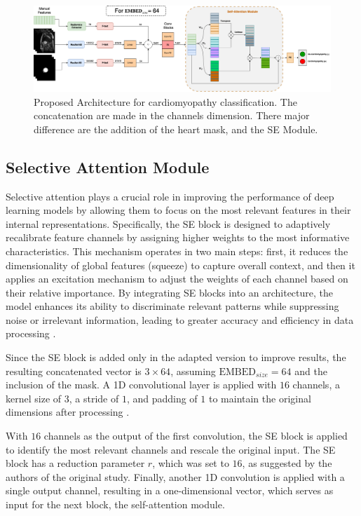 \documentclass[journal,twoside,web]{ieeecolor}
\begin{document}
\begin{figure}[h]
\centerline{\includegraphics[width=\columnwidth]{figures/fig02.png}}
\caption{Proposed Architecture for cardiomyopathy classification. The concatenation are made in the channels dimension. There major difference are the addition of the heart mask, and the SE Module.}
\label{fig02}
\end{figure}

\subsection{Selective Attention Module}

Selective attention plays a crucial role in improving the performance of deep learning models by allowing them to focus on the most relevant features in their internal representations. Specifically, the \gls{SE} block is designed to adaptively recalibrate feature channels by assigning higher weights to the most informative characteristics. This mechanism operates in two main steps: first, it reduces the dimensionality of global features (squeeze) to capture overall context, and then it applies an excitation mechanism to adjust the weights of each channel based on their relative importance. By integrating \gls{SE} blocks into an architecture, the model enhances its ability to discriminate relevant patterns while suppressing noise or irrelevant information, leading to greater accuracy and efficiency in data processing \cite{yangNeuralNetworkDesign2024a}.

Since the \gls{SE} block is added only in the adapted version to improve results, the resulting concatenated vector is $3 \times 64$, assuming $\text{EMBED}_{size}= 64$ and the inclusion of the mask. A 1D convolutional layer is applied with $16$ channels, a kernel size of $3$, a stride of $1$, and padding of $1$ to maintain the original dimensions after processing \cite{huSqueezeandExcitationNetworks2018}.  

With $16$ channels as the output of the first convolution, the \gls{SE} block is applied to identify the most relevant channels and rescale the original input. The SE block has a reduction parameter $r$, which was set to $16$, as suggested by the authors of the original study. Finally, another 1D convolution is applied with a single output channel, resulting in a one-dimensional vector, which serves as input for the next block, the self-attention module.
\end{document}
